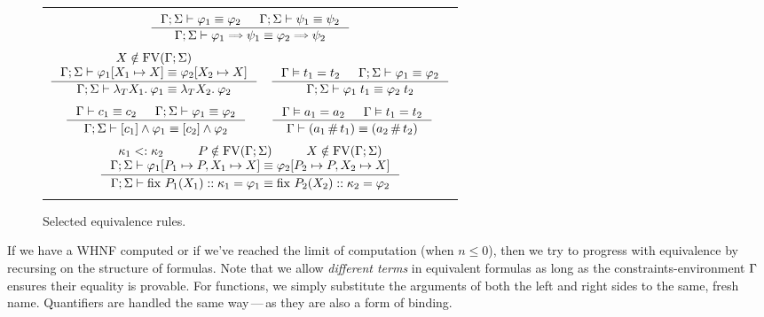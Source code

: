 \documentclass[english, mgr]{iithesis}
\renewcommand{\it}[1]{\textit{#1}}
\newcommand{\fix}[3]{\ensuremath{\text{fix }#1(#2)\ofkind#3=}}\newcommand{\myatop}[2]{\ensuremath{\genfrac{}{}{0pt}{}{#1\hfill}{#2\hfill}}}
\newcommand{\mdash}{\,---\,}
\def\-{{\mdash}}
\begin{document}
\pagebreak

\begin{figure}[htbp]
  \centering
\begin{tabularx}{\textwidth}{|C|}
\hline \\ $
  \inference{
    \jgmnt[\Gamma; \Sigma]{\formphi_1 \equiv \formphi_2 } &
    \jgmnt[\Gamma; \Sigma]{\psi_1 \equiv \psi_2 }
    }{
    \jgmnt[\Gamma; \Sigma]{\formphi_1 \fImp \psi_1 \equiv \formphi_2 \fImp \psi_2 }
  }
$ \\ \\ $
  \inference{
    \termv \notin \fv[\Gamma; \Sigma] \\
    \jgmnt[\Gamma; \Sigma]{\formphi_1[\termv_1 \mapsto \termv] \equiv \formphi_2[\termv_2 \mapsto \termv] }
    }{
    \jgmnt[\Gamma; \Sigma]{\fLamTerm{\termv_1}\formphi_1 \equiv \fLamTerm{\termv_2}\formphi_2 }
  }
  \quad
  \inference{
    \cjgmnt[\Gamma]{\term_1 \ceq \term_2} &
    \jgmnt[\Gamma; \Sigma]{\formphi_1 \equiv \formphi_2 }
    }{
    \jgmnt[\Gamma; \Sigma]{\formphi_1 \fAppTerm \term_1 \equiv \formphi_2 \fAppTerm \term_2 }
  }
$ \\ \\ $
  \inference{
    \jgmnt[\Gamma]{\constr_1 \equiv \constr_2 } &
    \jgmnt[\Gamma; \Sigma]{\formphi_1 \equiv \formphi_2 }
  }{
    \jgmnt[\Gamma; \Sigma]{\fCAnd{\constr_1}\formphi_1 \equiv \fCAnd{\constr_2}\formphi_2 }
  }
\qquad
  \inference{
    \cjgmnt[\Gamma]{\atomv_1 \ceq \atomv_2 } & \cjgmnt[\Gamma]{\term_1 \ceq \term_2 }
  }{
    \jgmnt[\Gamma]{(\atomv_1 \cfresh \term_1) \equiv (\atomv_2 \cfresh \term_2) }
  }
$ \\ \\ $
  \inference{
    \kind_1 \subkind \kind_2 &
    P \notin \fv[\Gamma; \Sigma] & \termv \notin \fv[\Gamma; \Sigma] \\
    \jgmnt[\Gamma; \Sigma]{\formphi_1[P_1 \mapsto P, \termv_1 \mapsto \termv] \equiv \formphi_2[P_2 \mapsto P, \termv_2 \mapsto \termv] }
    }{
    \jgmnt[\Gamma; \Sigma]{\fix{P_1}{\termv_1}{\kind_1}\formphi_1 \equiv \fix{P_2}{\termv_2}{\kind_2}\formphi_2}
  }
$ \\ \\ \hline
\end{tabularx}
  \caption{Selected equivalence rules.}
  \label{fig:compute}
\end{figure}
If we have a WHNF computed or if we've reached the limit of computation (when $ n \leqslant 0$),
then we try to progress with equivalence by recursing on the structure of formulas.
Note that we allow \it{different terms} in equivalent formulas as long as the constraints-environment $\Gamma$ ensures their equality is provable.
For functions, we simply substitute the arguments of both the left and right sides to the same, fresh name.
Quantifiers are handled the same way\-as they are also a form of binding.
\end{document}
